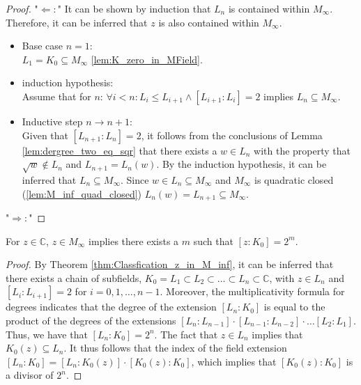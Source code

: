 \begin{proof}
    "$\Leftarrow:$"
    It can be shown by induction that $L_n$ is contained within $M_{\infty}$. 
    Therefore, it can be inferred that $z$ is also contained within $M_{\infty}$.
    \begin{itemize}
        \item Base case $n=1$: \\
            $L_1 = K_0 \subseteq M_{\infty}$ \ref{lem:K_zero_in_MField}.
        
        \item induction hypothesis: \\
            Assume that for $n$: $\forall i < n: L_i \le L_{i+1} \land [L_{i+1}:L_i]=2$ implies $L_n \subseteq M_{\infty}$.
        \item Inductive step $n \to n+1$: \\
            Given that $[L_{n+1}:L_n] = 2$, it follows from the conclusions of Lemma \ref{lem:dergree_two_eq_sqr} that there exists a $w \in L_n$ with the property that $ \sqrt{w} \notin L_n$ and $L_{n+1} = L_n(w)$.
            By the induction hypothesis, it can be inferred that $L_n \subseteq M_{\infty}$. Since $w \in L_n  \subseteq M_{\infty}$ and $ M_{\infty}$ is quadratic closed (\ref{lem:M_inf_quad_closed}) $L_n(w) = L_{n+1} \subseteq M_{\infty}$.
    \end{itemize}
    "$\Rightarrow:$"

\end{proof}

\begin{lemma}
    \label{lem:Classfication_z_in_M_inf_2m}
    For $z \in \mathbb{C}$, $z \in M_{\infty}$ implies there exists a $m$ such that $[z:K_0] = 2^m$.
\end{lemma}

\begin{proof}
    By Theorem \ref{thm:Classfication_z_in_M_inf}, it can be inferred that there exists a chain of subfields, $K_0 = L_1 \subset L_2 \subset \dots \subset L_n \subset \mathbb{C}$, with $z \in L_n$ and $[L_i : L_{i+1}] = 2$ for $i = 0, 1, \dots, n-1$. 
    Moreover, the multiplicativity formula for degrees indicates that the degree of the extension $[L_n : K_0]$ is equal to the product of the degrees of the extensions $[L_n : L_{n-1}] \cdot [L_{n-1} : L_{n-2}] \cdot \dots [L_2 : L_1]$.
    Thus, we have that $[L_n : K_0] = 2^n$. 
    The fact that $z\in L_n$ implies that $K_0(z)\subseteq L_n$. 
    It thus follows that the index of the field extension $[L_n : K_0] = [L_n : K_0(z)]\cdot [K_0(z) : K_0]$, which implies that $[K_0(z) : K_0]$ is a divisor of $2^n$. 
\end{proof}

